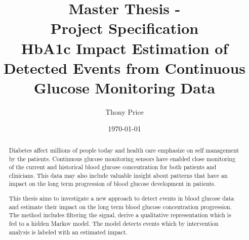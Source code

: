 \documentclass{kththesis}
\title{%
    Master Thesis - \\
    Project Specification \\
    \vspace{.5em}
    \large HbA1c Impact Estimation of Detected Events from Continuous Glucose Monitoring Data \\
}
\author{Thony Price}
\date{\today}
\begin{document}
\frontmatter
\titlepage

\begin{abstract}
  Diabetes affect millions of people today and health care emphasize on self management by the patients.
  Continuous glucose monitoring sensors have enabled close monitoring of the current and historical blood glucose concentration for both patients and clinicians.
  This data may also include valuable insight about patterns that have an impact on the long term progression of blood glucose development in patients.

  This thesis aims to investigate a new approach to detect events in blood glucose data and estimate their impact on the long term blood glucose concentration progression.
  The method includes filtering the signal, derive a qualitative representation which is fed to a hidden Markov model.
  The model detects events which by intervention analysis is labeled with an estimated impact.
\end{abstract}

\tableofcontents
\mainmatter








\printbibliography[heading=bibintoc]
\end{document}
